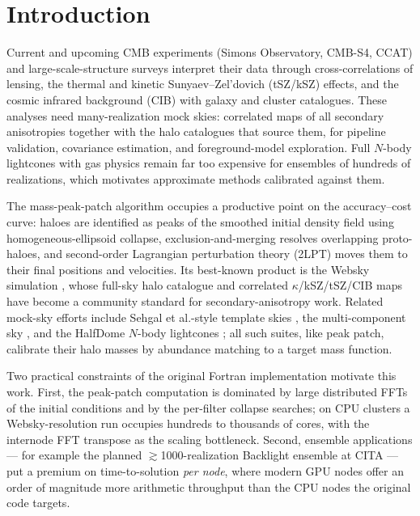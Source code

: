 \section{Introduction}
\label{sec:intro}

Current and upcoming CMB experiments (Simons Observatory, CMB-S4, CCAT) and
large-scale-structure surveys interpret their data through cross-correlations
of lensing, the thermal and kinetic Sunyaev--Zel'dovich (tSZ/kSZ) effects, and
the cosmic infrared background (CIB) with galaxy and cluster catalogues. These
analyses need many-realization mock skies: correlated maps of all secondary
anisotropies together with the halo catalogues that source them, for pipeline
validation, covariance estimation, and foreground-model exploration. Full
$N$-body lightcones with gas physics remain far too expensive for ensembles of
hundreds of realizations, which motivates approximate methods calibrated
against them.

The mass-peak-patch algorithm \citep{BondMyers1996a, Stein2019} occupies a
productive point on the accuracy--cost curve: haloes are identified as peaks of
the smoothed initial density field using homogeneous-ellipsoid collapse,
exclusion-and-merging resolves overlapping proto-haloes, and second-order
Lagrangian perturbation theory (2LPT) moves them to their final positions and
velocities. Its best-known product is the Websky simulation
\citep{Stein2020}, whose full-sky halo catalogue and correlated
$\kappa$/kSZ/tSZ/CIB maps have become a community standard for
secondary-anisotropy work. Related mock-sky efforts include Sehgal et
al.-style template skies \citep{Sehgal2010}, the  multi-component
sky \citep{Omori2024}, and the HalfDome $N$-body lightcones
\citep{HalfDome2024}; all such suites, like peak patch, calibrate their halo
masses by abundance matching to a target mass function.

Two practical constraints of the original Fortran implementation motivate this
work. First, the peak-patch computation is dominated by large distributed FFTs
of the initial conditions and by the per-filter collapse searches; on CPU
clusters a Websky-resolution run occupies hundreds to thousands of cores, with
the internode FFT transpose as the scaling bottleneck. Second, ensemble
applications --- for example the planned $\gtrsim$1000-realization Backlight
ensemble at CITA --- put a premium on time-to-solution \emph{per node}, where
modern GPU nodes offer an order of magnitude more arithmetic throughput than
the CPU nodes the original code targets.

